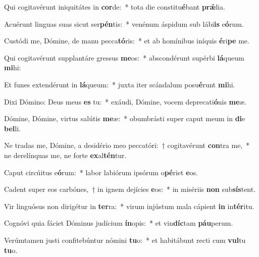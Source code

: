 \item Qui cogitavérunt iniquitátes in \textbf{cor}de:~* tota die constitu\textbf{é}bant \textbf{prǽ}lia.
\item Acuérunt linguas suas sicut ser\textbf{pén}tis:~* venénum áspidum sub lábi\textbf{is} e\textbf{ó}rum.
\item Custódi me, Dómine, de manu pecca\textbf{tó}ris:~* et ab homínibus iníquis \textbf{é}ri\textbf{pe} me.
\item Qui cogitavérunt supplantáre gressus \textbf{me}os:~* abscondérunt supérbi \textbf{lá}queum \textbf{mi}hi:
\item Et funes extendérunt in \textbf{lá}queum:~* juxta iter scándalum posu\textbf{é}runt \textbf{mi}hi.
\item Dixi Dómino: Deus meus \textbf{es} tu:~* exáudi, Dómine, vocem deprecati\textbf{ó}nis \textbf{me}æ.
\item Dómine, Dómine, virtus salútis \textbf{me}æ:~* obumbrásti super caput meum in \textbf{di}e \textbf{bel}li.
\item Ne tradas me, Dómine, a desidério meo peccatóri:~† cogitavérunt \textbf{con}tra me,~* ne derelínquas me, ne forte \textbf{ex}al\textbf{tén}tur.
\item Caput circúitus e\textbf{ó}rum:~* labor labiórum ipsórum o\textbf{pé}riet \textbf{e}os.
\item Cadent super eos carbónes,~† in ignem dejícies \textbf{e}os:~* in misériis \textbf{non} sub\textbf{sís}tent.
\item Vir linguósus non dirigétur in \textbf{ter}ra:~* virum injústum mala cápient \textbf{in} in\textbf{tér}itu.
\item Cognóvi quia fáciet Dóminus judícium \textbf{ín}opis:~* et vin\textbf{díc}tam \textbf{páu}perum.
\item Verúmtamen justi confitebúntur nómini \textbf{tu}o:~* et habitábunt recti cum \textbf{vul}tu \textbf{tu}o.
